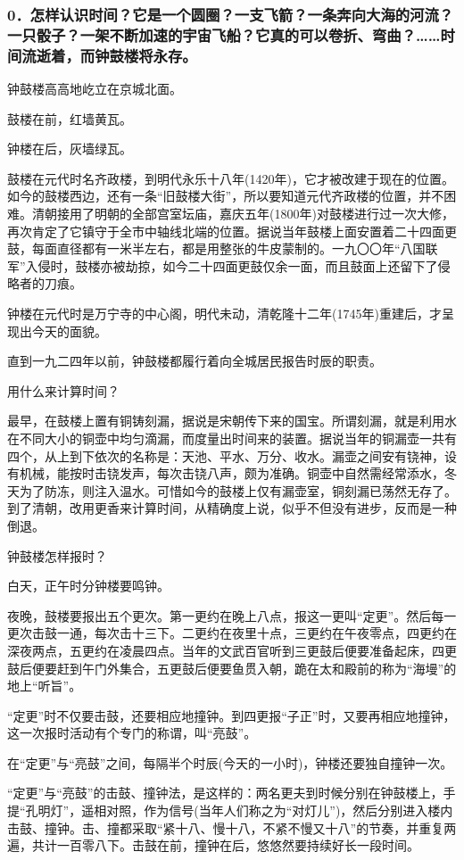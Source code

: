 \subsubsection*{0．怎样认识时间？它是一个圆圈？一支飞箭？一条奔向大海的河流？一只骰子？一架不断加速的宇宙飞船？它真的可以卷折、弯曲？……时间流逝着，而钟鼓楼将永存。}
\par 钟鼓楼高高地屹立在京城北面。
\par 鼓楼在前，红墙黄瓦。
\par 钟楼在后，灰墙绿瓦。
\par 鼓楼在元代时名齐政楼，到明代永乐十八年(1420年)，它才被改建于现在的位置。如今的鼓楼西边，还有一条“旧鼓楼大街”，所以要知道元代齐政楼的位置，并不困难。清朝接用了明朝的全部宫室坛庙，嘉庆五年(1800年)对鼓楼进行过一次大修，再次肯定了它镇守于全市中轴线北端的位置。据说当年鼓楼上面安置着二十四面更鼓，每面直径都有一米半左右，都是用整张的牛皮蒙制的。一九〇〇年“八国联军”入侵时，鼓楼亦被劫掠，如今二十四面更鼓仅余一面，而且鼓面上还留下了侵略者的刀痕。
\par 钟楼在元代时是万宁寺的中心阁，明代未动，清乾隆十二年(1745年)重建后，才呈现出今天的面貌。
\par 直到一九二四年以前，钟鼓楼都履行着向全城居民报告时辰的职责。
\par 用什么来计算时间？
\par 最早，在鼓楼上置有铜铸刻漏，据说是宋朝传下来的国宝。所谓刻漏，就是利用水在不同大小的铜壶中均匀滴漏，而度量出时间来的装置。据说当年的铜漏壶一共有四个，从上到下依次的名称是：天池、平水、万分、收水。漏壶之间安有铙神，设有机械，能按时击铙发声，每次击铙八声，颇为准确。铜壶中自然需经常添水，冬天为了防冻，则注入温水。可惜如今的鼓楼上仅有漏壶室，铜刻漏已荡然无存了。到了清朝，改用更香来计算时间，从精确度上说，似乎不但没有进步，反而是一种倒退。
\par 钟鼓楼怎样报时？
\par 白天，正午时分钟楼要鸣钟。
\par 夜晚，鼓楼要报出五个更次。第一更约在晚上八点，报这一更叫“定更”。然后每一更次击鼓一通，每次击十三下。二更约在夜里十点，三更约在午夜零点，四更约在深夜两点，五更约在凌晨四点。当年的文武百官听到三更鼓后便要准备起床，四更鼓后便要赶到午门外集合，五更鼓后便要鱼贯入朝，跪在太和殿前的称为“海墁”的地上“听旨”。
\par “定更”时不仅要击鼓，还要相应地撞钟。到四更报“子正”时，又要再相应地撞钟，这一次报时活动有个专门的称谓，叫“亮鼓”。
\par 在“定更”与“亮鼓”之间，每隔半个时辰(今天的一小时)，钟楼还要独自撞钟一次。
\par “定更”与“亮鼓”的击鼓、撞钟法，是这样的：两名更夫到时候分别在钟鼓楼上，手提“孔明灯”，遥相对照，作为信号(当年人们称之为“对灯儿”)，然后分别进入楼内击鼓、撞钟。击、撞都采取“紧十八、慢十八，不紧不慢又十八”的节奏，并重复两遍，共计一百零八下。击鼓在前，撞钟在后，悠悠然要持续好长一段时间。
